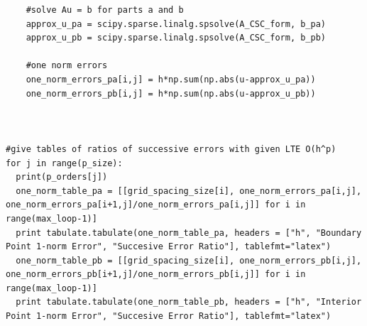 \documentclass[12pt]{article}
\begin{document}
\begin{verbatim}
    #solve Au = b for parts a and b
    approx_u_pa = scipy.sparse.linalg.spsolve(A_CSC_form, b_pa)
    approx_u_pb = scipy.sparse.linalg.spsolve(A_CSC_form, b_pb)

    #one norm errors
    one_norm_errors_pa[i,j] = h*np.sum(np.abs(u-approx_u_pa))
    one_norm_errors_pb[i,j] = h*np.sum(np.abs(u-approx_u_pb))



#give tables of ratios of successive errors with given LTE O(h^p)
for j in range(p_size):
  print(p_orders[j])
  one_norm_table_pa = [[grid_spacing_size[i], one_norm_errors_pa[i,j], one_norm_errors_pa[i+1,j]/one_norm_errors_pa[i,j]] for i in range(max_loop-1)]
  print tabulate.tabulate(one_norm_table_pa, headers = ["h", "Boundary Point 1-norm Error", "Succesive Error Ratio"], tablefmt="latex")
  one_norm_table_pb = [[grid_spacing_size[i], one_norm_errors_pb[i,j], one_norm_errors_pb[i+1,j]/one_norm_errors_pb[i,j]] for i in range(max_loop-1)]
  print tabulate.tabulate(one_norm_table_pb, headers = ["h", "Interior Point 1-norm Error", "Succesive Error Ratio"], tablefmt="latex")
\end{verbatim}
\end{document}
